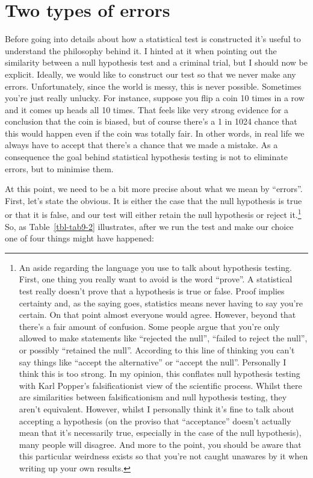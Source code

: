 \documentclass[
  a4paper,
]{book}
\begin{document}
\section{Two types of errors}\label{two-types-of-errors}

Before going into details about how a statistical test is constructed
it's useful to understand the philosophy behind it. I hinted at it when
pointing out the similarity between a null hypothesis test and a
criminal trial, but I should now be explicit. Ideally, we would like to
construct our test so that we never make any errors. Unfortunately,
since the world is messy, this is never possible. Sometimes you're just
really unlucky. For instance, suppose you flip a coin 10 times in a row
and it comes up heads all 10 times. That feels like very strong evidence
for a conclusion that the coin is biased, but of course there's a 1 in
1024 chance that this would happen even if the coin was totally fair. In
other words, in real life we always have to accept that there's a chance
that we made a mistake. As a consequence the goal behind statistical
hypothesis testing is not to eliminate errors, but to minimise them.

At this point, we need to be a bit more precise about what we mean by
``errors''. First, let's state the obvious. It is either the case that
the null hypothesis is true or that it is false, and our test will
either retain the null hypothesis or reject it.\footnote{An aside
  regarding the language you use to talk about hypothesis testing.
  First, one thing you really want to avoid is the word ``prove''. A
  statistical test really doesn't prove that a hypothesis is true or
  false. Proof implies certainty and, as the saying goes, statistics
  means never having to say you're certain. On that point almost
  everyone would agree. However, beyond that there's a fair amount of
  confusion. Some people argue that you're only allowed to make
  statements like ``rejected the null'', ``failed to reject the null'',
  or possibly ``retained the null''. According to this line of thinking
  you can't say things like ``accept the alternative'' or ``accept the
  null''. Personally I think this is too strong. In my opinion, this
  conflates null hypothesis testing with Karl Popper's falsificationist
  view of the scientific process. Whilst there are similarities between
  falsificationism and null hypothesis testing, they aren't equivalent.
  However, whilst I personally think it's fine to talk about accepting a
  hypothesis (on the proviso that ``acceptance'' doesn't actually mean
  that it's necessarily true, especially in the case of the null
  hypothesis), many people will disagree. And more to the point, you
  should be aware that this particular weirdness exists so that you're
  not caught unawares by it when writing up your own results.} So, as
Table~\ref{tbl-tab9-2} illustrates, after we run the test and make our
choice one of four things might have happened:
\end{document}
